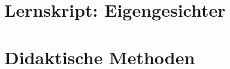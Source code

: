 \documentclass[12pt,a4paper]{article}
\numberwithin{taskcounter}{section}
\begin{document}
\part{Lernskript: Eigengesichter}


%





%

%
\clearpage
\part{Didaktische Methoden}








\clearpage
\nocite{*}


\end{document}

